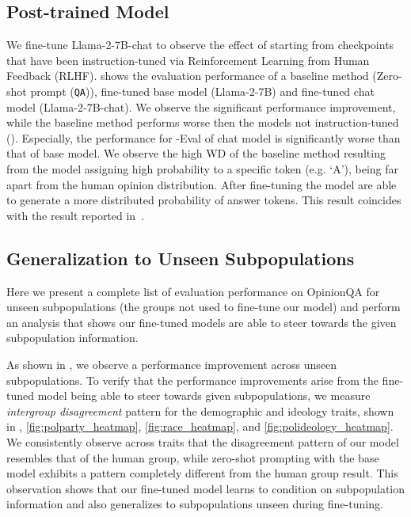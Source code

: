 


\subsection{Post-trained Model}
\label{appendix_chat}
We fine-tune Llama-2-7B-chat to observe the effect of starting 
from checkpoints that have been instruction-tuned via Reinforcement Learning from Human Feedback (RLHF).
 shows the evaluation performance of a baseline method (Zero-shot prompt (\texttt{QA})), fine-tuned base model (Llama-2-7B) and fine-tuned chat model (Llama-2-7B-chat).
We observe the significant performance improvement,
while the baseline method performs worse then the models not instruction-tuned ().
Especially, the performance for \OURDATA-Eval of chat model is significantly worse than that of base model.
We observe the high WD of the baseline method resulting from the model assigning high probability to a specific token (e.g. `A'),
being far apart from the human opinion distribution.
After fine-tuning the model are able to generate a more distributed probability of answer tokens.
This result coincides with the result reported in~\cite{moon-etal-2024-virtual}.



\subsection{Generalization to Unseen Subpopulations}
\label{appendix_unseen_subpopulation}
Here we present a complete list of evaluation performance on OpinionQA
for unseen subpopulations (the groups not used to fine-tune our model)
and perform an analysis that shows
our fine-tuned models are able to steer towards the given subpopulation information.

As shown in , we observe a performance improvement across unseen subpopulations.
To verify that the performance improvements arise from the fine-tuned model being able to steer towards given subpopulations, we measure \textit{intergroup disagreement} pattern for the demographic and ideology traits, shown in
,
\ref{fig:polparty_heatmap},
\ref{fig:race_heatmap},
and \ref{fig:polideology_heatmap}.
We consistently observe across traits that the disagreement pattern of our model resembles that of the human group, while zero-shot prompting with the base model exhibits a pattern completely different from the human group result.
This observation shows that our fine-tuned model learns to condition on subpopulation information and also generalizes to subpopulations unseen during fine-tuning.

